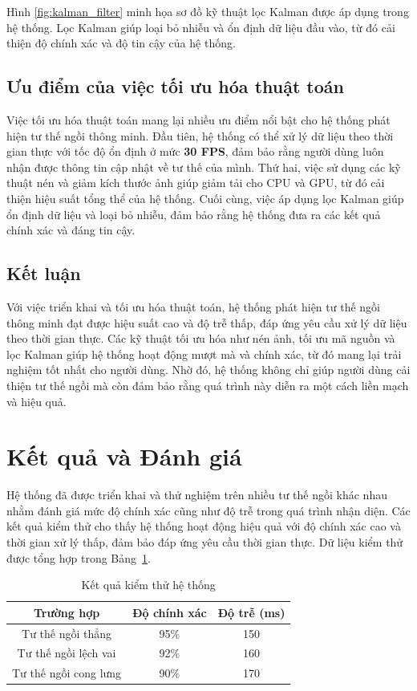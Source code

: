 \documentclass[conference]{IEEEtran}
\begin{document}
Hình \ref{fig:kalman_filter} minh họa sơ đồ kỹ thuật lọc Kalman được áp dụng trong hệ thống. Lọc Kalman giúp loại bỏ nhiễu và ổn định dữ liệu đầu vào, từ đó cải thiện độ chính xác và độ tin cậy của hệ thống.

\subsection{Ưu điểm của việc tối ưu hóa thuật toán}
Việc tối ưu hóa thuật toán mang lại nhiều ưu điểm nổi bật cho hệ thống phát hiện tư thế ngồi thông minh. Đầu tiên, hệ thống có thể xử lý dữ liệu theo thời gian thực với tốc độ ổn định ở mức \textbf{30 FPS}, đảm bảo rằng người dùng luôn nhận được thông tin cập nhật về tư thế của mình. Thứ hai, việc sử dụng các kỹ thuật nén và giảm kích thước ảnh giúp giảm tải cho CPU và GPU, từ đó cải thiện hiệu suất tổng thể của hệ thống. Cuối cùng, việc áp dụng lọc Kalman giúp ổn định dữ liệu và loại bỏ nhiễu, đảm bảo rằng hệ thống đưa ra các kết quả chính xác và đáng tin cậy.

\subsection{Kết luận}
Với việc triển khai và tối ưu hóa thuật toán, hệ thống phát hiện tư thế ngồi thông minh đạt được hiệu suất cao và độ trễ thấp, đáp ứng yêu cầu xử lý dữ liệu theo thời gian thực. Các kỹ thuật tối ưu hóa như nén ảnh, tối ưu mã nguồn và lọc Kalman giúp hệ thống hoạt động mượt mà và chính xác, từ đó mang lại trải nghiệm tốt nhất cho người dùng. Nhờ đó, hệ thống không chỉ giúp người dùng cải thiện tư thế ngồi mà còn đảm bảo rằng quá trình này diễn ra một cách liền mạch và hiệu quả.


\section{Kết quả và Đánh giá}

Hệ thống đã được triển khai và thử nghiệm trên nhiều tư thế ngồi khác nhau nhằm đánh giá mức độ chính xác cũng như độ trễ trong quá trình nhận diện. Các kết quả kiểm thử cho thấy hệ thống hoạt động hiệu quả với độ chính xác cao và thời gian xử lý thấp, đảm bảo đáp ứng yêu cầu thời gian thực. Dữ liệu kiểm thử được tổng hợp trong Bảng~\ref{table:results}.

\begin{table}[H]
    \centering
    \caption{Kết quả kiểm thử hệ thống}
    \label{table:results}
    \begin{tabular}{@{}ccc@{}}
        \toprule
        \textbf{Trường hợp} & \textbf{Độ chính xác} & \textbf{Độ trễ (ms)} \\
        \midrule
        Tư thế ngồi thẳng & 95\% & 150 \\
        Tư thế ngồi lệch vai & 92\% & 160 \\
        Tư thế ngồi cong lưng & 90\% & 170 \\
        \bottomrule
    \end{tabular}
\end{table}
\end{document}
